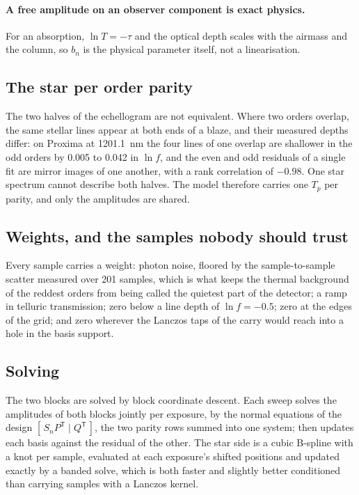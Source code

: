 \documentclass[11pt]{article}
\begin{document}
\paragraph{A free amplitude on an observer component is exact physics.} For an
absorption, $\ln T = -\tau$ and the optical depth scales with the airmass and
the column, so $b_n$ is the physical parameter itself, not a linearisation.

\subsection{The star per order parity}

The two halves of the echellogram are not equivalent. Where two orders overlap,
the same stellar lines appear at both ends of a blaze, and their measured
depths differ: on Proxima at 1201.1~nm the four lines of one overlap are
shallower in the odd orders by 0.005 to 0.042 in $\ln f$, and the even and odd
residuals of a single fit are mirror images of one another, with a rank
correlation of $-0.98$. One star spectrum cannot describe both halves. The
model therefore carries one $T_p$ per parity, and only the amplitudes are
shared.

\subsection{Weights, and the samples nobody should trust}

Every sample carries a weight: photon noise, floored by the sample-to-sample
scatter measured over 201 samples, which is what keeps the thermal background
of the reddest orders from being called the quietest part of the detector; a
ramp in telluric transmission; zero below a line depth of $\ln f = -0.5$; zero
at the edges of the grid; and zero wherever the Lanczos taps of the carry would
reach into a hole in the basis support.

\subsection{Solving}

The two blocks are solved by block coordinate descent. Each sweep solves the
amplitudes of both blocks jointly per exposure, by the normal equations of the
design $[\,S_n P^{\mathsf T} \mid Q^{\mathsf T}\,]$, the two parity rows
summed into one system; then updates each basis against the residual of the
other. The star side is a cubic B-spline with a knot per sample, evaluated at
each exposure's shifted positions and updated exactly by a banded solve, which
is both faster and slightly better conditioned than carrying samples with a
Lanczos kernel.
\end{document}
